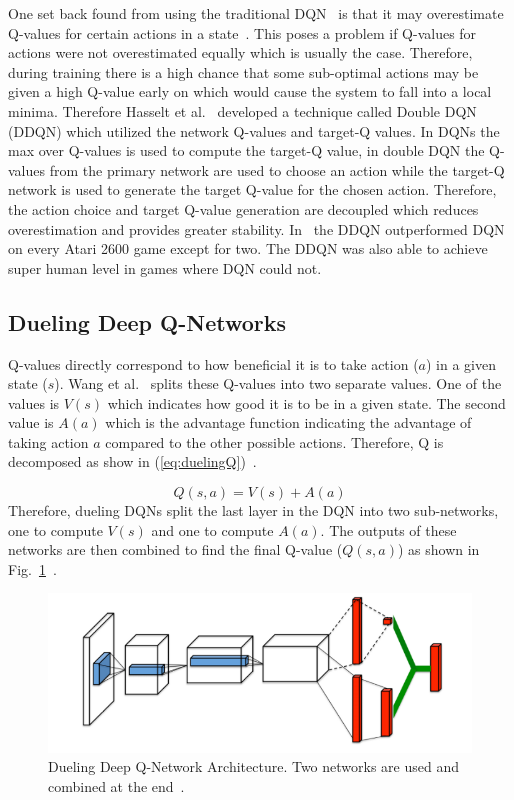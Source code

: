 \documentclass[12pt,american]{report}
\begin{document}
One set back found from using the traditional DQN~\cite{atari} is that it may overestimate Q-values for certain actions in a state~\cite{van2016deep}. This poses a problem if Q-values for actions were not overestimated equally which is usually the case.  Therefore, during training there is a high chance that some sub-optimal actions may be given a high Q-value early on which would cause the system to fall into a local minima.  Therefore Hasselt et al.~\cite{van2016deep} developed a technique called Double DQN (DDQN) which utilized the network Q-values and target-Q values.  In DQNs the max over Q-values is used to compute the target-Q value, in double DQN the Q-values from the primary network are used to choose an action while the target-Q network is used to generate the target Q-value for the chosen action. Therefore, the action choice and target Q-value generation are decoupled which reduces overestimation and provides greater stability.  In~\cite{van2016deep} the DDQN outperformed DQN on every Atari 2600 game except for two. The DDQN was also able to achieve super human level in games where DQN could not. 

\subsection{Dueling Deep Q-Networks}
\label{sec:DuelingDQN}
Q-values directly correspond to how beneficial it is to take action ($a$) in a given state ($s$). Wang et al.~\cite{wang2015dueling} splits these Q-values into two separate values.  One of the values is $V(s)$ which indicates how good it is to be in a given state. The second value is $A(a)$ which is the advantage function indicating the advantage of taking action $a$ compared to the other possible actions.  Therefore, Q is decomposed as show in (\ref{eq:duelingQ})~\cite{wang2015dueling}.

\begin{equation}
          \label{eq:duelingQ}
          Q(s,a) = V(s) + A(a)%
\end{equation}
Therefore, dueling DQNs split the last layer in the DQN into two sub-networks, one to compute $V(s)$ and one to compute $A(a)$.  The outputs of these networks are then combined to find the final Q-value ($Q(s,a)$) as shown in Fig.~\ref{fig:duelingDQN}~\cite{wang2015dueling}.

\begin{figure}
\centering
\includegraphics[scale=1]{images/duelingDQN.png}
\caption{Dueling Deep Q-Network Architecture. Two networks are used and combined at the end~\cite{wang2015dueling}.}
\label{fig:duelingDQN}
\end{figure}
\end{document}
